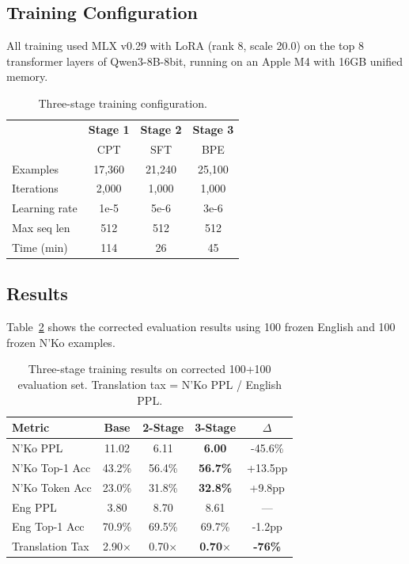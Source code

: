 \documentclass[11pt]{article}
\begin{document}
\subsection{Training Configuration}

All training used MLX v0.29 with LoRA (rank 8, scale 20.0) on the top 8 transformer layers of Qwen3-8B-8bit, running on an Apple M4 with 16GB unified memory.

\begin{table}[t]
\centering
\small
\begin{tabular}{lccc}
\toprule
& \textbf{Stage 1} & \textbf{Stage 2} & \textbf{Stage 3} \\
& CPT & SFT & BPE \\
\midrule
Examples & 17,360 & 21,240 & 25,100 \\
Iterations & 2,000 & 1,000 & 1,000 \\
Learning rate & 1e-5 & 5e-6 & 3e-6 \\
Max seq len & 512 & 512 & 512 \\
Time (min) & 114 & 26 & 45 \\
\bottomrule
\end{tabular}
\caption{Three-stage training configuration.}
\label{tab:training-config}
\end{table}

\subsection{Results}

Table~\ref{tab:main-results} shows the corrected evaluation results using 100 frozen English and 100 frozen N'Ko examples.

\begin{table}[t]
\centering
\small
\begin{tabular}{lcccc}
\toprule
\textbf{Metric} & \textbf{Base} & \textbf{2-Stage} & \textbf{3-Stage} & \textbf{$\Delta$} \\
\midrule
N'Ko PPL & 11.02 & 6.11 & \textbf{6.00} & -45.6\% \\
N'Ko Top-1 Acc & 43.2\% & 56.4\% & \textbf{56.7\%} & +13.5pp \\
N'Ko Token Acc & 23.0\% & 31.8\% & \textbf{32.8\%} & +9.8pp \\
\midrule
Eng PPL & 3.80 & 8.70 & 8.61 & --- \\
Eng Top-1 Acc & 70.9\% & 69.5\% & 69.7\% & -1.2pp \\
\midrule
Translation Tax & 2.90$\times$ & 0.70$\times$ & \textbf{0.70$\times$} & \textbf{-76\%} \\
\bottomrule
\end{tabular}
\caption{Three-stage training results on corrected 100+100 evaluation set. Translation tax = N'Ko PPL / English PPL.}
\label{tab:main-results}
\end{table}
\end{document}
